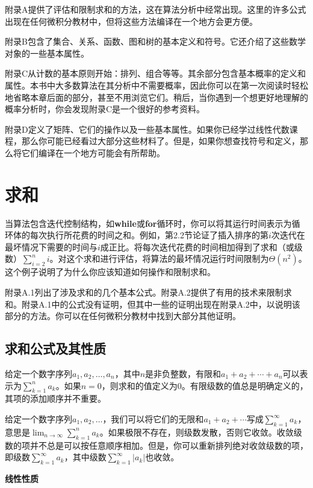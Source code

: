 \documentclass[lang=cn,newtx,10pt,scheme=chinese]{elegantbook}
\begin{document}
附录A提供了评估和限制求和的方法，这在算法分析中经常出现。这里的许多公式出现在任何微积分教材中，但将这些方法编译在一个地方会更方便。

附录B包含了集合、关系、函数、图和树的基本定义和符号。它还介绍了这些数学对象的一些基本属性。

附录C从计数的基本原则开始：排列、组合等等。其余部分包含基本概率的定义和属性。本书中大多数算法在其分析中不需要概率，因此你可以在第一次阅读时轻松地省略本章后面的部分，甚至不用浏览它们。稍后，当你遇到一个想更好地理解的概率分析时，你会发现附录C是一个很好的参考资料。

附录D定义了矩阵、它们的操作以及一些基本属性。如果你已经学过线性代数课程，那么你可能已经看过大部分这些材料了。但是，如果你想查找符号和定义，那么将它们编译在一个地方可能会有所帮助。

\chapter{求和}

当算法包含迭代控制结构，如\textbf{while}或\textbf{for}循环时，你可以将其运行时间表示为循环体的每次执行所花费的时间之和。例如，第2.2节论证了插入排序的第$i$次迭代在最坏情况下需要的时间与$i$成正比。将每次迭代花费的时间相加得到了求和（或级数）$\sum_{i=2}^n i$。对这个求和进行评估，将算法的最坏情况运行时间限制为$\Theta(n^2)$。这个例子说明了为什么你应该知道如何操作和限制求和。

附录A.1列出了涉及求和的几个基本公式。附录A.2提供了有用的技术来限制求和。附录A.1中的公式没有证明，但其中一些的证明出现在附录A.2中，以说明该部分的方法。你可以在任何微积分教材中找到大部分其他证明。

\section{求和公式及其性质}\label{section:A.1}

给定一个数字序列$a_1,a_2,\ldots,a_n$，其中$n$是非负整数，有限和$a_1+a_2+\cdots+a_n$可以表示为$\sum_{k=1}^n a_k$。如果$n=0$，则求和的值定义为0。有限级数的值总是明确定义的，其项的添加顺序并不重要。

给定一个数字序列$a_1,a_2,\ldots$，我们可以将它们的无限和$a_1+a_2+\cdots$写成$\sum_{k=1}^{\infty} a_k$，意思是$\lim _{n \rightarrow \infty} \sum_{k=1}^n a_k$。如果极限不存在，则级数发散，否则它收敛。收敛级数的项并不总是可以按任意顺序相加。但是，你可以重新排列绝对收敛级数的项，即级数$\sum_{k=1}^{\infty} a_k$，其中级数$\sum_{k=1}^{\infty}|a_k|$也收敛。

\textbf{线性性质}
\end{document}
